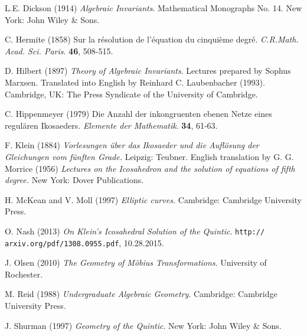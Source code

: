 %
\begin{thebibliography}{9}

 L.E. Dickson (1914) \textit{Algebraic Invariants}. Mathematical Monographs No. 14. New York: John Wiley \& Sons.

 C. Hermite (1858) Sur la résolution de l'équation du cinqui\`eme degré. \textit{C.R.Math. Acad. Sci. Paris}. {\bf 46}, 508-515.

 D. Hilbert (1897) \textit{Theory of Algebraic Invariants}. Lectures prepared by Sophus Marxsen. Translated into English by Reinhard C. Laubenbacher (1993). Cambridge, UK: The Press Syndicate of the University of Cambridge.

 C. Hippenmeyer (1979) Die Anzahl der inkongruenten ebenen Netze eines regulären Ikosaeders. \textit{Elemente der Mathematik}. {\bf 34}, 61-63.

 F. Klein (1884) \textit{Vorlesungen über das Ikosaeder und die Auflösung der Gleichungen vom fünften Grade.} Leipzig: Teubner. English translation by G. G. Morrice (1956) \textit{Lectures on the Icosahedron and the solution of equations of fifth degree.} New York: Dover Publications. 

 H. McKean and V. Moll (1997) \textit{Elliptic curves.} Cambridge: Cambridge University Press.

 O. Nash (2013) \textit{On Klein's Icosahedral Solution of the Quintic}. {\tt http:// arxiv.org/pdf/1308.0955.pdf}, 10.28.2015.

 J. Olsen (2010) \textit{The Geometry of Möbius Transformations}. University of Rochester.

 M. Reid (1988) \textit{Undergraduate Algebraic Geometry}. Cambridge: Cambridge University Press.

 J. Shurman (1997) \textit{Geometry of the Quintic}. New York: John Wiley \& Sons.

\end{thebibliography}
